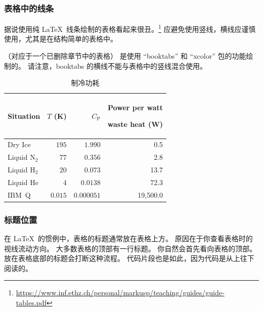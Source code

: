 \subsubsection{表格中的线条}
\label{sec:app:styleguide:Ruled Line in Table}

据说使用纯 \LaTeX\ 线条绘制的表格看起来很丑。\footnote{
  \url{https://www.inf.ethz.ch/personal/markusp/teaching/guides/guide-tables.pdf}
}
应避免使用竖线，横线应谨慎使用，尤其是在结构简单的表格中。


\newcommand{\TLo}{T_\mathrm{L}}
\newcommand{\THi}{T_\mathrm{H}}
\newcommand{\CPf}{C_\mathrm{P}}

（对应于一个已删除章节中的表格）
是使用 ``booktabs'' 和 ``xcolor'' 包的功能绘制的。
请注意，booktabs 的横线不能与表格中的竖线混合使用。

\begin{table}
\renewcommand*{\arraystretch}{1.2}\centering\small
\begin{tabular}{lrrr}\toprule
Situation
	& $T$ (K)
		& $\CPf$ & \parbox[b]{.75in}{\raggedleft Power per watt\par waste heat (W)} \\
\midrule
Dry Ice
	& $195$
		& $1.990$
			& 0.5 \\
Liquid N$_2$
	& $77$
		& $0.356$
			& 2.8 \\
Liquid H$_2$
	& $20$
		& $0.073$
			& 13.7 \\
Liquid He
	& $4$
		& $0.0138$
			& 72.3 \\
IBM~Q	& $0.015$
		& $0.000051$
			& 19,500.0 \\
\bottomrule
\end{tabular}
\caption{制冷功耗}
\label{tab:app:styleguide:Refrigeration Power Consumption}
\end{table}

\subsubsection{标题位置}
\label{sec:app:styleguide:Position of Caption}

在 \LaTeX\ 的惯例中，表格的标题通常放在表格上方。
原因在于你查看表格时的视线流动方向。
大多数表格的顶部有一行标题。
你自然会首先看向表格的顶部。
放在表格底部的标题会打断这种流程。
代码片段也是如此，因为代码是从上往下阅读的。

